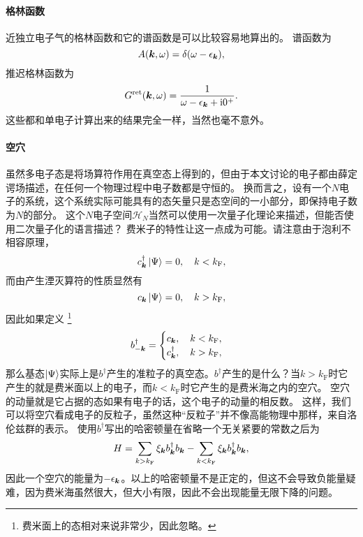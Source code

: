 \paragraph{格林函数} 近独立电子气的格林函数和它的谱函数是可以比较容易地算出的。
谱函数为
\begin{equation}
    A(\vb*{k}, \omega) = \delta(\omega - \epsilon_{\vb*{k}}),
\end{equation}
推迟格林函数为
\begin{equation}
    G^\text{ret}(\vb*{k}, \omega) = \frac{1}{\omega - \epsilon_{\vb*{k}} + \mathrm{i} 0^+}.
\end{equation}
这些都和单电子计算出来的结果完全一样，当然也毫不意外。

\paragraph{空穴} 虽然多电子态是将场算符作用在真空态上得到的，但由于本文讨论的电子都由薛定谔场描述，在任何一个物理过程中电子数都是守恒的。
换而言之，设有一个$N$电子的系统，这个系统实际可能具有的态矢量只是态空间的一小部分，即保持电子数为$N$的部分。
这个$N$电子空间$\mathcal{H}_N$当然可以使用一次量子化理论来描述，但能否使用二次量子化的语言描述？
费米子的特性让这一点成为可能。请注意由于泡利不相容原理，
\[
    {c}^\dagger_{\vb*{k}} \ket{\Psi} = 0, \quad k < k_\text{F},
\]
而由产生湮灭算符的性质显然有
\[
    {c}_{\vb*{k}} \ket{\Psi} = 0, \quad k > k_\text{F},
\]
因此如果定义%
\footnote{费米面上的态相对来说非常少，因此忽略。}%
\begin{equation}
    {b}^\dagger_{-\vb*{k}} = \begin{cases}
        {c}_{\vb*{k}}, \quad k < k_\text{F}, \\
        {c}_{\vb*{k}}^\dagger, \quad k > k_\text{F},
    \end{cases}
\end{equation}
那么基态$\ket{\Psi}$实际上是${b}^\dagger$产生的准粒子的真空态。${b}^\dagger$产生的是什么？当$k>k_\text{F}$时它产生的就是费米面以上的电子，而$k<k_\text{F}$时它产生的是费米海之内的空穴。
空穴的动量就是它占据的态如果有电子的话，这个电子的动量的相反数。
这样，我们可以将空穴看成电子的反粒子，虽然这种“反粒子”并不像高能物理中那样，来自洛伦兹群的表示。
使用${b}^\dagger$写出的哈密顿量在省略一个无关紧要的常数之后为
\[
    {H} = \sum_{k > k_\text{F}} \xi_{\vb*{k}} {b}^\dagger_{\vb*{k}} {b}_{\vb*{k}} - \sum_{k < k_\text{F}} \xi_{\vb*{k}} {b}^\dagger_{\vb*{k}} {b}_{\vb*{k}},
\]
因此一个空穴的能量为$-\epsilon_{\vb*{k}}$。以上的哈密顿量不是正定的，但这不会导致负能量疑难，因为费米海虽然很大，但大小有限，因此不会出现能量无限下降的问题。

